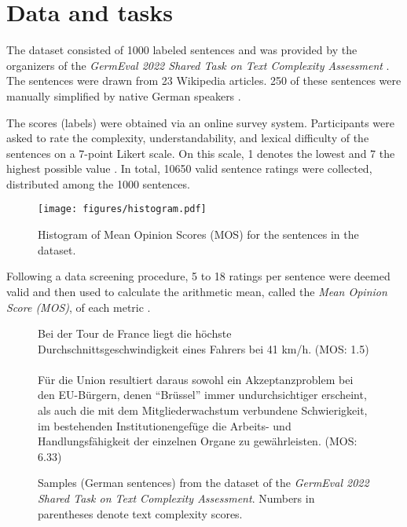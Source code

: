 \documentclass[11pt,a4paper]{article}
\begin{document}
\section{Data and tasks}
\label{sec:data_and_tasks}

The dataset consisted of 1000 labeled sentences \cite{Naderi2019a} and was provided by the organizers of the \emph{GermEval 2022 Shared Task on Text Complexity Assessment} \cite{Mohtaj2022}.
The sentences were drawn from 23 Wikipedia articles. 250 of these sentences were manually simplified by native German speakers \cite{Naderi2019a}.

The scores (labels) were obtained via an online survey system.
Participants were asked to rate the complexity, understandability, and lexical difficulty of the sentences on a 7-point Likert scale. On this scale, 1 denotes the lowest and 7 the highest possible value \cite{Naderi2019a}.
In total, 10650 valid sentence ratings were collected, distributed among the 1000 sentences.

\begin{figure}[t]
    \centering
    \texttt{[image: figures/histogram.pdf]}
    \caption{Histogram of Mean Opinion Scores (MOS) for the sentences in the dataset.}
    \label{fig:data_histogram}
\end{figure}

Following a data screening procedure, 5 to 18 ratings per sentence were deemed valid and then used to calculate the arithmetic mean, called the \emph{Mean Opinion Score (MOS)}, of each metric \cite{Naderi2019a}.

\begin{figure}[t]
    \begin{mdframed}{
            \small
            Bei der Tour de France liegt die höchste Durchschnittsgeschwindigkeit eines Fahrers bei 41 km/h. (MOS: 1.5)\\
            \\
            Für die Union resultiert daraus sowohl ein Akzeptanzproblem bei den EU-Bürgern, denen \enquote{Brüssel} immer undurchsichtiger erscheint, als auch die mit dem Mitgliederwachstum verbundene Schwierigkeit, im bestehenden Institutionengefüge die Arbeits- und Handlungsfähigkeit der einzelnen Organe zu gewährleisten. (MOS: 6.33)
        }
    \end{mdframed}
    \caption{Samples (German sentences) from the dataset of the \emph{GermEval 2022 Shared Task on Text Complexity Assessment}. Numbers in parentheses denote text complexity scores.}
    \label{fig:example_data}
\end{figure}
\end{document}
